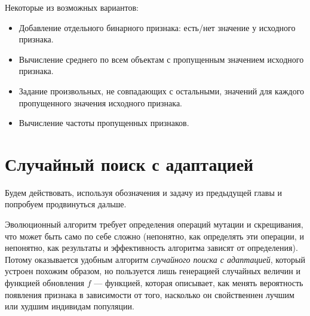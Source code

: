 Некоторые из возможных вариантов:
\begin{itemize}
	\item Добавление отдельного бинарного признака: есть/нет значение у исходного признака.
	\item Вычисление среднего по всем объектам с пропущенным значением исходного признака.
	\item Задание произвольных, не совпадающих с остальными, значений для каждого пропущенного значения исходного признака.
	\item Вычисление частоты пропущенных признаков.
\end{itemize}





\section*{Случайный поиск с адаптацией}
Будем действовать, используя обозначения и задачу из предыдущей главы и попробуем продвинуться дальше.

Эволюционный алгоритм требует определения операций мутации и скрещивания, что может быть само по себе сложно (непонятно, как определять эти операции, и непонятно, как результаты и эффективность алгоритма зависят от определения). Потому оказывается удобным алгоритм \textit{случайного поиска с адаптацией}, который устроен похожим образом, но пользуется лишь генерацией случайных величин и функцией обновления $f$ --- функцией, которая описывает, как менять вероятность появления признака в зависимости от того, насколько он свойственнен лучшим или худшим индивидам популяции.

